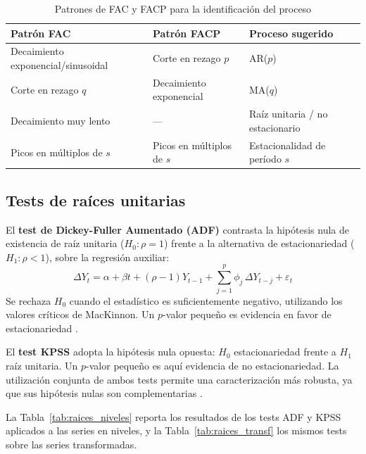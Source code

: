 \documentclass[12pt, a4paper]{article}
\begin{document}
\begin{table}[H]
    \centering
    \caption{Patrones de FAC y FACP para la identificación del proceso}
    \label{tab:patrones_fac_facp}
    \begin{tabular}{lll}
        \toprule
        \textbf{Patrón FAC} & \textbf{Patrón FACP} & \textbf{Proceso sugerido} \\
        \midrule
        Decaimiento exponencial/sinusoidal & Corte en rezago $p$          & AR($p$) \\
        Corte en rezago $q$                & Decaimiento exponencial      & MA($q$) \\
        Decaimiento muy lento              & ---                          & Raíz unitaria / no estacionario \\
        Picos en múltiplos de $s$          & Picos en múltiplos de $s$    & Estacionalidad de período $s$ \\
        \bottomrule
    \end{tabular}
\end{table}

\subsection{Tests de raíces unitarias}

El \textbf{test de Dickey-Fuller Aumentado (ADF)} contrasta la hipótesis nula de existencia de raíz unitaria ($H_0: \rho = 1$) frente a la alternativa de estacionariedad ($H_1: \rho < 1$), sobre la regresión auxiliar:
$$\Delta Y_t = \alpha + \beta t + (\rho - 1)Y_{t-1} + \sum_{j=1}^{p} \phi_j\,\Delta Y_{t-j} + \varepsilon_t$$
Se rechaza $H_0$ cuando el estadístico es suficientemente negativo, utilizando los valores críticos de MacKinnon. Un $p$-valor pequeño es evidencia en favor de estacionariedad \cite{enders2009}.

El \textbf{test KPSS} \cite{kwiatkowski1992} adopta la hipótesis nula opuesta: $H_0$ estacionariedad frente a $H_1$ raíz unitaria. Un $p$-valor pequeño es aquí evidencia de no estacionariedad. La utilización conjunta de ambos tests permite una caracterización más robusta, ya que sus hipótesis nulas son complementarias \cite{levendis2018}.

La Tabla~\ref{tab:raices_niveles} reporta los resultados de los tests ADF y KPSS aplicados a las series en niveles, y la Tabla~\ref{tab:raices_transf} los mismos tests sobre las series transformadas.
\end{document}
